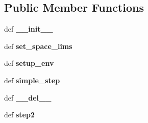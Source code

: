 \subsection*{Public Member Functions}
\begin{DoxyCompactItemize}
\item 
\hypertarget{classaml__rl__envs_1_1aml__rl__env_1_1_a_m_l_rl_env_a52319c357f7f5e4944ea9aadaa5f1cf2}{def {\bfseries \-\_\-\-\_\-init\-\_\-\-\_\-}}\label{classaml__rl__envs_1_1aml__rl__env_1_1_a_m_l_rl_env_a52319c357f7f5e4944ea9aadaa5f1cf2}

\item 
\hypertarget{classaml__rl__envs_1_1aml__rl__env_1_1_a_m_l_rl_env_a97cd38614d9614738c8173b40f676052}{def {\bfseries set\-\_\-space\-\_\-lims}}\label{classaml__rl__envs_1_1aml__rl__env_1_1_a_m_l_rl_env_a97cd38614d9614738c8173b40f676052}

\item 
\hypertarget{classaml__rl__envs_1_1aml__rl__env_1_1_a_m_l_rl_env_ab6a75670899758ddea383a609bdbb4a4}{def {\bfseries setup\-\_\-env}}\label{classaml__rl__envs_1_1aml__rl__env_1_1_a_m_l_rl_env_ab6a75670899758ddea383a609bdbb4a4}

\item 
\hypertarget{classaml__rl__envs_1_1aml__rl__env_1_1_a_m_l_rl_env_a9d4ad3f8b1ce4a8914d568c25ad2754b}{def {\bfseries simple\-\_\-step}}\label{classaml__rl__envs_1_1aml__rl__env_1_1_a_m_l_rl_env_a9d4ad3f8b1ce4a8914d568c25ad2754b}

\item 
\hypertarget{classaml__rl__envs_1_1aml__rl__env_1_1_a_m_l_rl_env_a925a64bb525e1a9b042bcf45d359d77d}{def {\bfseries \-\_\-\-\_\-del\-\_\-\-\_\-}}\label{classaml__rl__envs_1_1aml__rl__env_1_1_a_m_l_rl_env_a925a64bb525e1a9b042bcf45d359d77d}

\item 
\hypertarget{classaml__rl__envs_1_1aml__rl__env_1_1_a_m_l_rl_env_a84962ad3d1cde17a0bcde06bbffbdb75}{def {\bfseries step2}}\label{classaml__rl__envs_1_1aml__rl__env_1_1_a_m_l_rl_env_a84962ad3d1cde17a0bcde06bbffbdb75}

\end{DoxyCompactItemize}
